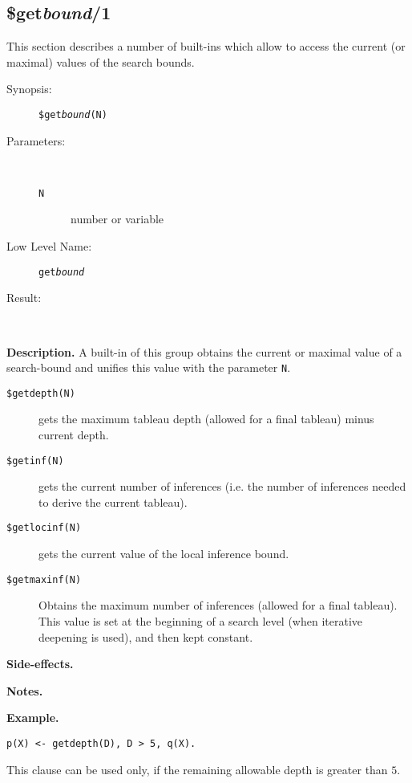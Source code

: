 %
%
%
\subsection{\$get{\em bound\/}/1}

This section describes a number of built-ins which allow to access the
current (or maximal) values of the search bounds.
\begin{description}
\item[Synopsis:]
	{\tt \$get{\em bound}(N)}
\item[Parameters:]\ \\[-0.5cm]
	\begin{description}
	\item[{\tt N}] number or variable
	\end{description}
\item[Low Level Name:]
	{\tt get{\em bound}}
\item[Result:]\ \\
\end{description}

\vspace*{0.5cm}
\noindent
{\bf Description.}
A built-in of this group obtains the current or maximal value
of a search-bound and
unifies this value with the parameter {\tt N}.
\begin{description}
\item[{\tt \$getdepth(N)}]
gets the maximum tableau depth
            (allowed for a final tableau) minus current depth.
\item[{\tt \$getinf(N)}]
   gets the current number
            of inferences (i.e. the number of inferences needed
            to derive the current tableau).
\item[{\tt \$getlocinf(N)}]
   gets the current value 
            of the local inference bound.
\item[{\tt \$getmaxinf(N)}]
Obtains the maximum number
            of inferences (allowed for a final tableau).
This value is set at the beginning of a search level (when iterative
deepening is used), and then kept constant.
\end{description}

\vspace*{0.5cm}
\noindent
{\bf Side-effects.}

\vspace*{0.5cm}
\noindent
{\bf Notes.}

\vspace*{0.5cm}
\noindent
{\bf Example.}
\begin{verbatim}
p(X) <- getdepth(D), D > 5, q(X).
\end{verbatim}

This clause can be used only, if the remaining allowable depth
is greater than $5$.


